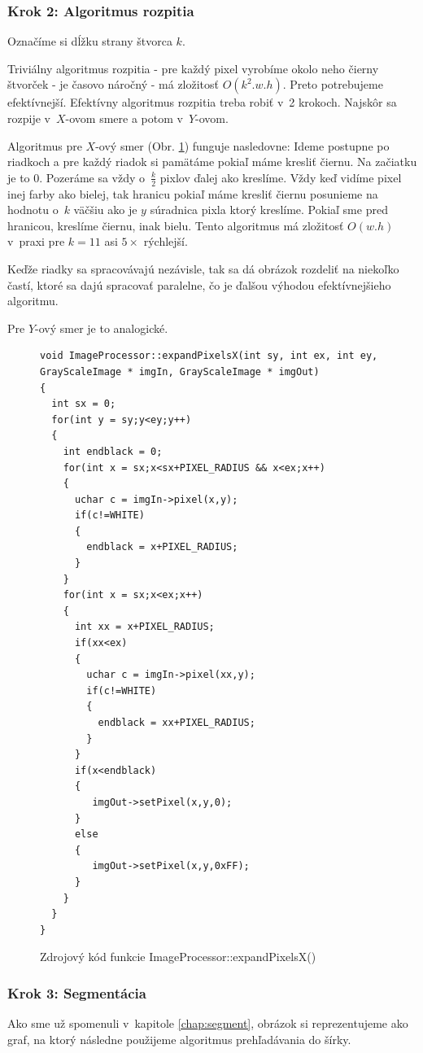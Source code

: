 \subsubsection{Krok 2: Algoritmus rozpitia}
Označíme si dĺžku strany štvorca $k$.

Triviálny algoritmus rozpitia - pre každý pixel vyrobíme okolo neho čierny štvorček - je časovo náročný - má zložitosť $O(k^2.w.h)$. Preto potrebujeme efektívnejší. 
Efektívny algoritmus rozpitia treba robiť v~2 krokoch. Najskôr sa rozpije v~$X$-ovom smere a potom v~$Y$-ovom.

Algoritmus pre $X$-ový smer (Obr. \ref{fig:expandPixelsX}) funguje nasledovne: Ideme postupne po riadkoch a pre každý riadok si pamätáme pokiaľ máme kresliť čiernu.
Na začiatku je to 0. Pozeráme sa vždy o~$\frac{k}{2}$ pixlov ďalej ako kreslíme.
Vždy keď vidíme pixel inej farby ako bielej, tak hranicu pokiaľ máme kresliť čiernu posunieme na hodnotu o~$k$ väčšiu ako je $y$ súradnica pixla ktorý kreslíme. Pokiaľ sme pred hranicou, kreslíme čiernu, inak bielu. Tento algoritmus má zložitosť $O(w.h)$ v~praxi pre $k=11$ asi $5\times$ rýchlejší.  

Keďže riadky sa spracovávajú nezávisle, tak sa dá obrázok rozdeliť na niekoľko častí, ktoré sa dajú spracovať paralelne, čo je ďalšou výhodou efektívnejšieho algoritmu.

Pre $Y$-ový smer je to analogické. 

\begin{figure}[htp]
\begin{lstlisting}
void ImageProcessor::expandPixelsX(int sy, int ex, int ey, GrayScaleImage * imgIn, GrayScaleImage * imgOut)
{
  int sx = 0;
  for(int y = sy;y<ey;y++)
  {
    int endblack = 0;
    for(int x = sx;x<sx+PIXEL_RADIUS && x<ex;x++)
    {
      uchar c = imgIn->pixel(x,y);
      if(c!=WHITE)
      {
        endblack = x+PIXEL_RADIUS;
      }
    }
    for(int x = sx;x<ex;x++)
    {
      int xx = x+PIXEL_RADIUS;
      if(xx<ex)
      {
        uchar c = imgIn->pixel(xx,y);
        if(c!=WHITE)
        {
          endblack = xx+PIXEL_RADIUS;
        }
      }
      if(x<endblack)
      {
         imgOut->setPixel(x,y,0);
      }
      else
      {
         imgOut->setPixel(x,y,0xFF);
      }
    }
  }
}
\end{lstlisting}
\caption{Zdrojový kód funkcie ImageProcessor::expandPixelsX()}
\label{fig:expandPixelsX}
\end{figure}

\subsubsection{Krok 3: Segmentácia}
Ako sme už spomenuli v~kapitole \ref{chap:segment}, obrázok si reprezentujeme ako graf, na ktorý následne použijeme algoritmus prehľadávania do šírky.

